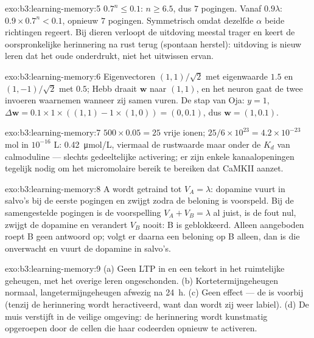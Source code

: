 \begin{solution}{exo:b3:learning-memory:5}
$0.7^{n} \le 0.1$: $n \ge 6.5$, dus $7$ pogingen. Vanaf $0.9\lambda$:
$0.9\times 0.7^{n} < 0.1$, opnieuw $7$ pogingen. Symmetrisch omdat
dezelfde $\alpha$ beide richtingen regeert. Bij dieren verloopt de
uitdoving meestal trager en keert de oorspronkelijke herinnering na
rust terug (spontaan herstel): uitdoving is nieuw leren dat het oude
onderdrukt, niet het uitwissen ervan.
\end{solution}

\begin{solution}{exo:b3:learning-memory:6}
Eigenvectoren $(1,1)/\sqrt{2}$ met eigenwaarde $1.5$ en $(1,-1)/\sqrt{2}$
met $0.5$; Hebb draait $\mathbf{w}$ naar $(1,1)$, en het neuron gaat de
twee invoeren waarnemen wanneer zij samen vuren. De stap van Oja: $y = 1$,
$\Delta\mathbf{w} = 0.1\times 1\times((1,1) - 1\times(1,0)) = (0,0.1)$,
dus $\mathbf{w} = (1, 0.1)$.
\end{solution}

\begin{solution}{exo:b3:learning-memory:7}
$500\times 0.05 = 25$ vrije ionen; $25/6\times 10^{23} = 4.2\times 10^{-23}$
mol in $10^{-16}$ L: \qty{0.42}{\micro mol/L}, viermaal de rustwaarde
maar onder de $K_{d}$ van calmoduline --- slechts gedeeltelijke
activering; er zijn enkele kanaalopeningen tegelijk nodig om het
micromolaire bereik te bereiken dat CaMKII aanzet.
\end{solution}

\begin{solution}{exo:b3:learning-memory:8}
A wordt getraind tot $V_{A} = \lambda$: dopamine vuurt in salvo's bij
de eerste pogingen en zwijgt zodra de beloning is voorspeld. Bij de
samengestelde pogingen is de voorspelling $V_{A} + V_{B} = \lambda$ al
juist, is de fout nul, zwijgt de dopamine en verandert $V_{B}$ nooit: B
is geblokkeerd. Alleen aangeboden roept B geen antwoord op; volgt er
daarna een beloning op B alleen, dan is die onverwacht en vuurt de
dopamine in salvo's.
\end{solution}

\begin{solution}{exo:b3:learning-memory:9}
(a) Geen LTP in  en een tekort in het ruimtelijke geheugen, met het
overige leren ongeschonden. (b) Kortetermijngeheugen normaal,
langetermijngeheugen afwezig na \qty{24}{h}. (c) Geen effect --- de
 is voorbij (tenzij de herinnering wordt heractiveerd, want
dan wordt zij weer labiel). (d) De muis verstijft in de veilige
omgeving: de herinnering wordt kunstmatig opgeroepen door de cellen die
haar codeerden opnieuw te activeren.
\end{solution}

